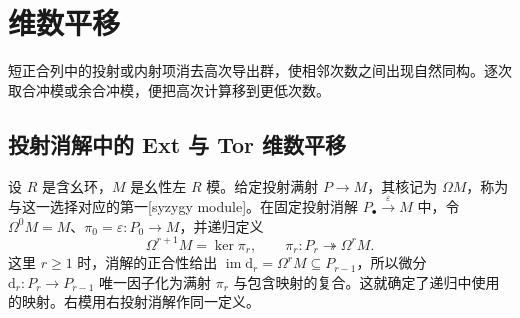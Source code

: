 
\section{维数平移}
\label{b4:sec:0805}

短正合列中的投射或内射项消去高次导出群，使相邻次数之间出现自然同构。逐次取合冲模或余合冲模，便把高次计算移到更低次数。


%
%
%

\subsection{投射消解中的 Ext 与 Tor 维数平移}
\label{b4:subsec:0805:01}

\begin{definition}\label{b4:def:syzygy-basic}
	设 \(R\) 是含幺环，\(M\) 是幺性左 \(R\) 模。给定投射满射 \(P\to M\)，其核记为 \(\Omega M\)，称为与这一选择对应的第一[syzygy module]。在固定投射消解 \(P_\bullet\xrightarrow{\varepsilon}M\) 中，令 \(\Omega^0M=M\)、\(\pi_0=\varepsilon:P_0\to M\)，并递归定义
	\[
		\Omega^{r+1}M=\ker\pi_r,\qquad \pi_r:P_r\twoheadrightarrow\Omega^rM.
	\]
	这里 \(r\ge1\) 时，消解的正合性给出 \(\operatorname{im}\mathrm{d}_r=\Omega^rM\subseteq P_{r-1}\)，所以微分 \(\mathrm{d}_r:P_r\to P_{r-1}\) 唯一因子化为满射 \(\pi_r\) 与包含映射的复合。这就确定了递归中使用的映射。右模用右投射消解作同一定义。
\end{definition}

